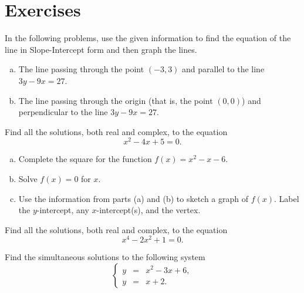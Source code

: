 \documentclass[12pt]{amsart}
\begin{document}
\section{Exercises}

\begin{thm}[18 Points]\label{ex5}
  In the following problems, use the given information to find the equation of the line in Slope-Intercept form and then graph the lines.
  \begin{enumerate}[(a)]
  \item
    The line passing through the point $(-3, 3)$ and parallel to the line $3y - 9x = 27$.
    \vspace{3in}
  \item
    The line passing through the origin (that is, the point $(0,0)$) and perpendicular to the line $3y - 9x = 27$.
    \vspace{2in}
  \end{enumerate}
  \vspace{1in}
\end{thm}

\newpage
\begin{thm}[18 Points]\label{ex9}
  Find all the solutions, both real and complex, to the equation
  $$x^2 - 4x + 5 = 0.$$
  \vspace{2in}
\end{thm}

\begin{thm}[18 Points]\label{ex10}
  \begin{enumerate}[(a)]
  \item
    Complete the square for the function $f(x) = x^2 -x - 6$.
    \vspace{1in}
  \item
    Solve $f(x) = 0$ for $x$.
    \vspace{1in}
  \item
    Use the information from parts (a) and (b) to sketch a graph of $f(x)$.
    Label the $y$-intercept, any $x$-intercept(s), and the vertex.
    \vspace{2in}
  \end{enumerate}
\end{thm}

\newpage
\begin{thm}[18 Points]\label{ex9}
  Find all the solutions, both real and complex, to the equation
  $$x^4 - 2x^2 + 1 = 0.$$
  \vspace{3in}
\end{thm}

\begin{thm}[18 Points]\label{ex9}
  Find the simultaneous solutions to the following system
  $$\left\{\begin{array}{rcl}
    y &=& x^2 - 3x + 6,\\
    y &=& x + 2.
  \end{array}\right.$$
  \vspace{2in}
\end{thm}
\end{document}
